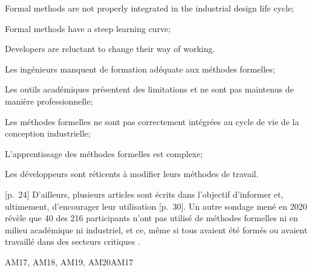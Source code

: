 {{\item [][---] Formal methods are not properly integrated in the industrial design life cycle;
\item [][---] Formal methods have a steep learning curve;
\item [][---] Developers are reluctant to change their way of working.
}{
\item [][---]Les ingénieurs manquent de formation adéquate aux méthodes formelles;
\item [][---]Les outils académiques présentent des limitations et ne sont pas maintenus de manière professionnelle;
\item [][---]Les méthodes formelles ne sont pas correctement intégrées au cycle de vie de la conception industrielle;
\item [][---]L'apprentissage des méthodes formelles est complexe;
\item [][---]Les développeurs sont réticents à modifier leurs méthodes de travail.
}{[p.~24]}
D'ailleurs, plusieurs articles sont écrits dans l'objectif d'informer et, ultimement, d'encourager leur utilisation [p.~30]. Un autre sondage mené en 2020 révèle que 40 des 216 participants n'ont pas utilisé de méthodes formelles ni en milieu académique ni industriel, et ce, même si tous avaient été formés ou avaient travaillé dans des secteurs critiques \cite{gleirscher_formal_2020}. 
}{AM17, AM18, AM19, AM20}{AM17}

